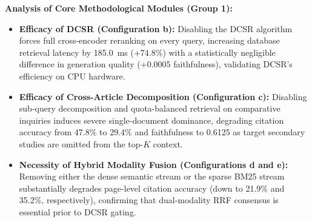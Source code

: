 \documentclass[10pt]{SPIIRAS_Proceedings}
\begin{document}
\begin{table}[H]
\centering
\caption{Component Ablation Analysis Separating Core Methodological Modules and Supporting System Infrastructure}
\label{tab:ablation_study}
\end{table}

\textbf{Analysis of Core Methodological Modules (Group 1):}
\begin{itemize}
    \item \textbf{Efficacy of DCSR (Configuration b):} Disabling the DCSR algorithm forces full cross-encoder reranking on every query, increasing database retrieval latency by 185.0~ms (+74.8\%) with a statistically negligible difference in generation quality (+0.0005 faithfulness), validating DCSR's efficiency on CPU hardware.
    \item \textbf{Efficacy of Cross-Article Decomposition (Configuration c):} Disabling sub-query decomposition and quota-balanced retrieval on comparative inquiries induces severe single-document dominance, degrading citation accuracy from 47.8\% to 29.4\% and faithfulness to 0.6125 as target secondary studies are omitted from the top-$K$ context.
    \item \textbf{Necessity of Hybrid Modality Fusion (Configurations d and e):} Removing either the dense semantic stream or the sparse BM25 stream substantially degrades page-level citation accuracy (down to 21.9\% and 35.2\%, respectively), confirming that dual-modality RRF consensus is essential prior to DCSR gating.
\end{itemize}
\end{document}
